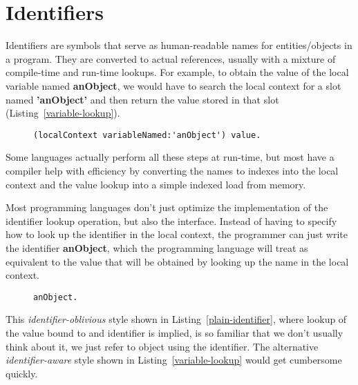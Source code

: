 \documentclass[preprint,authoryear]{acm_proc_article-sp}
\begin{document}
\section{Identifiers}
\label{identifiers}

Identifiers are symbols that serve as human-readable names for entities/objects
in a program.  They are converted to actual references, usually with a mixture of
compile-time and run-time lookups.  For example, to obtain the value of the local
variable named {\bf anObject}, we would have to search the local context for
a slot named {\bf 'anObject'} and then return the value stored in that slot (Listing~\ref{variable-lookup}).


\begin{figure}[htbp]
\begin{lstlisting}[style=L,label=variable-lookup,caption=Lookup of a local variable.]
  (localContext variableNamed:'anObject') value.
\end{lstlisting}
\end{figure}

Some  languages actually perform all these steps at run-time, but most 
have a compiler help with efficiency by converting the names to indexes into
the local context and the value lookup into a simple indexed load from memory.

Most programming languages don't just optimize the implementation of the identifier
lookup operation, but also the interface.  Instead of having to specify how to
look up the identifier in the local context, the programmer can just write the
identifier {\bf anObject}, which the programming language will treat as equivalent to the
value that will be obtained by looking up the name in the local context.  


\begin{figure}[htbp]
\begin{lstlisting}[style=L,label=plain-identifier,caption=Identifier-oblivious variable lookup.]
  anObject.
\end{lstlisting}
\end{figure}

This  {\em identifier-oblivious} style shown in Listing~\ref{plain-identifier}, where lookup of the value bound to and
identifier is implied, is so familiar that we don't usually think about it, we just
refer to object using the identifier.
The alternative {\em identifier-aware} style shown in Listing~\ref{variable-lookup} would get cumbersome quickly.
\end{document}
